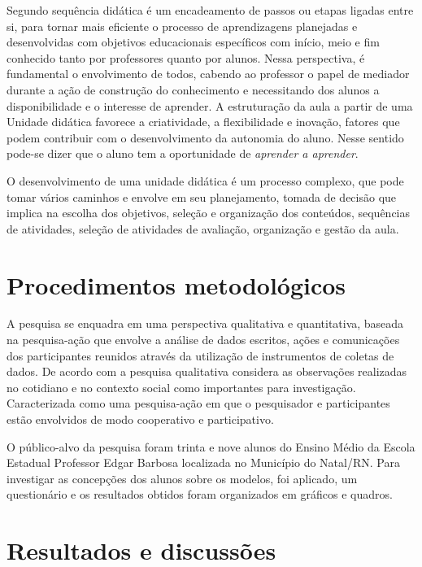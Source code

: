 \begin{refsection}
    Segundo \textcite{ZABALA1998prática} sequência didática é um encadeamento de passos ou etapas ligadas entre si, para tornar mais eficiente o processo de aprendizagens planejadas e desenvolvidas com objetivos educacionais específicos com início, meio e fim conhecido tanto por professores quanto por alunos. Nessa perspectiva, é fundamental o envolvimento de todos, cabendo ao professor o papel de mediador durante a ação de construção do conhecimento e necessitando dos alunos a disponibilidade e o interesse de aprender. A estruturação da aula a partir de uma Unidade didática favorece a criatividade, a flexibilidade e inovação, fatores que podem contribuir com o desenvolvimento da autonomia do aluno. Nesse sentido pode-se dizer que o aluno tem a oportunidade de \textit{aprender a aprender}.  

    O desenvolvimento de uma unidade didática é um processo complexo, que pode tomar vários caminhos e envolve em seu planejamento, tomada de decisão que implica na escolha dos objetivos, seleção e organização dos conteúdos, sequências de atividades, seleção de atividades de avaliação, organização e gestão da aula.  

    \section{Procedimentos metodológicos}

    A pesquisa se enquadra em uma perspectiva qualitativa e quantitativa, baseada na pesquisa-ação que envolve a análise de dados escritos, ações e comunicações dos participantes reunidos através da utilização de instrumentos de coletas de dados. De acordo com \textcite{FLICK2009Introdução} a pesquisa qualitativa considera as observações realizadas no cotidiano e no contexto social como importantes para investigação. Caracterizada como uma pesquisa-ação em que o pesquisador e participantes estão envolvidos de modo cooperativo e participativo.  

    O público-alvo da pesquisa foram trinta e nove alunos do Ensino Médio da Escola Estadual Professor Edgar Barbosa localizada no Município do Natal/RN. Para investigar as concepções dos alunos sobre os modelos, foi aplicado, um questionário e os resultados obtidos foram organizados em gráficos e quadros. 

    \section{Resultados e discussões}


\end{refsection}
